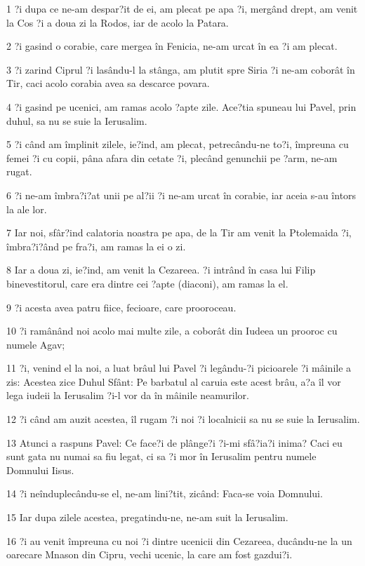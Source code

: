 \par 1 ?i dupa ce ne-am despar?it de ei, am plecat pe apa ?i, mergând drept, am venit la Cos ?i a doua zi la Rodos, iar de acolo la Patara.
\par 2 ?i gasind o corabie, care mergea în Fenicia, ne-am urcat în ea ?i am plecat.
\par 3 ?i zarind Ciprul ?i lasându-l la stânga, am plutit spre Siria ?i ne-am coborât în Tir, caci acolo corabia avea sa descarce povara.
\par 4 ?i gasind pe ucenici, am ramas acolo ?apte zile. Ace?tia spuneau lui Pavel, prin duhul, sa nu se suie la Ierusalim.
\par 5 ?i când am împlinit zilele, ie?ind, am plecat, petrecându-ne to?i, împreuna cu femei ?i cu copii, pâna afara din cetate ?i, plecând genunchii pe ?arm, ne-am rugat.
\par 6 ?i ne-am îmbra?i?at unii pe al?ii ?i ne-am urcat în corabie, iar aceia s-au întors la ale lor.
\par 7 Iar noi, sfâr?ind calatoria noastra pe apa, de la Tir am venit la Ptolemaida ?i, îmbra?i?ând pe fra?i, am ramas la ei o zi.
\par 8 Iar a doua zi, ie?ind, am venit la Cezareea. ?i intrând în casa lui Filip binevestitorul, care era dintre cei ?apte (diaconi), am ramas la el.
\par 9 ?i acesta avea patru fiice, fecioare, care prooroceau.
\par 10 ?i ramânând noi acolo mai multe zile, a coborât din Iudeea un prooroc cu numele Agav;
\par 11 ?i, venind el la noi, a luat brâul lui Pavel ?i legându-?i picioarele ?i mâinile a zis: Acestea zice Duhul Sfânt: Pe barbatul al caruia este acest brâu, a?a îl vor lega iudeii la Ierusalim ?i-l vor da în mâinile neamurilor.
\par 12 ?i când am auzit acestea, îl rugam ?i noi ?i localnicii sa nu se suie la Ierusalim.
\par 13 Atunci a raspuns Pavel: Ce face?i de plânge?i ?i-mi sfâ?ia?i inima? Caci eu sunt gata nu numai sa fiu legat, ci sa ?i mor în Ierusalim pentru numele Domnului Iisus.
\par 14 ?i neînduplecându-se el, ne-am lini?tit, zicând: Faca-se voia Domnului.
\par 15 Iar dupa zilele acestea, pregatindu-ne, ne-am suit la Ierusalim.
\par 16 ?i au venit împreuna cu noi ?i dintre ucenicii din Cezareea, ducându-ne la un oarecare Mnason din Cipru, vechi ucenic, la care am fost gazdui?i.
